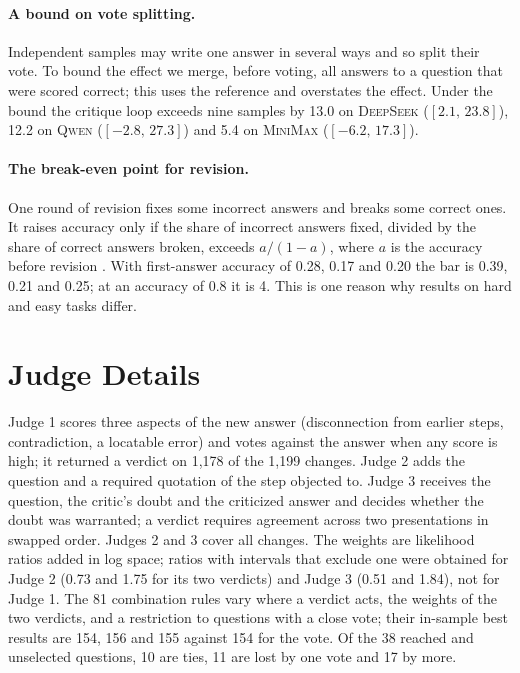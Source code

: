 \documentclass[11pt]{article}
\newcommand{\ds}{\textsc{DeepSeek}}
\newcommand{\qw}{\textsc{Qwen}}
\newcommand{\mm}{\textsc{MiniMax}}
\newcommand{\ci}[2]{$[#1,\,#2]$}
\begin{document}
\paragraph{A bound on vote splitting.}
Independent samples may write one answer in several ways and so split their vote.
To bound the effect we merge, before voting, all answers to a question that were scored correct; this uses the reference and overstates the effect.
Under the bound the critique loop exceeds nine samples by 13.0 on \ds{} (\ci{2.1}{23.8}), 12.2 on \qw{} (\ci{-2.8}{27.3}) and 5.4 on \mm{} (\ci{-6.2}{17.3}).

\paragraph{The break-even point for revision.}
One round of revision fixes some incorrect answers and breaks some correct ones.
It raises accuracy only if the share of incorrect answers fixed, divided by the share of correct answers broken, exceeds $a/(1-a)$, where $a$ is the accuracy before revision \citep{yang2024confidence}.
With first-answer accuracy of 0.28, 0.17 and 0.20 the bar is 0.39, 0.21 and 0.25; at an accuracy of 0.8 it is 4.
This is one reason why results on hard and easy tasks differ.

\section{Judge Details}
\label{app:judges}

Judge 1 scores three aspects of the new answer (disconnection from earlier steps, contradiction, a locatable error) and votes against the answer when any score is high; it returned a verdict on 1{,}178 of the 1{,}199 changes.
Judge 2 adds the question and a required quotation of the step objected to.
Judge 3 receives the question, the critic's doubt and the criticized answer and decides whether the doubt was warranted; a verdict requires agreement across two presentations in swapped order.
Judges 2 and 3 cover all changes.
The weights are likelihood ratios added in log space; ratios with intervals that exclude one were obtained for Judge 2 (0.73 and 1.75 for its two verdicts) and Judge 3 (0.51 and 1.84), not for Judge 1.
The 81 combination rules vary where a verdict acts, the weights of the two verdicts, and a restriction to questions with a close vote; their in-sample best results are 154, 156 and 155 against 154 for the vote.
Of the 38 reached and unselected questions, 10 are ties, 11 are lost by one vote and 17 by more.
\end{document}
